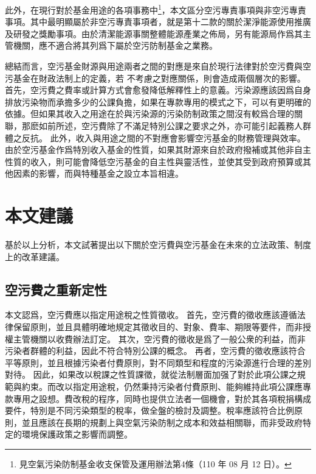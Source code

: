 \documentclass[12pt,a4paper]{article}
\begin{document}
此外，在現行對於基金用途的各項事務中\footnote{見空氣污染防制基金收支保管及運用辦法第4條（110 年 08 月 12 日）。}，本文區分空污專責事項與非空污專責事項。其中最明顯屬於非空污專責事項者，就是第十二款的關於潔淨能源使用推廣及研發之獎勵事項。由於清潔能源事關整體能源產業之佈局，另有能源局作爲其主管機關，應不適合將其列爲下屬於空污防制基金之業務。


總結而言，空污基金財源與用途兩者之間的對應是來自於現行法律對於空污費與空污基金在財政法制上的定義，若
不考慮之對應關係，則會造成兩個層次的影響。首先，空污費之費率或計算方式會愈發降低解釋性上的意義。污染源應該因爲自身排放污染物而承擔多少的公課負擔，如果在專款專用的模式之下，可以有更明確的依據。但如果其收入之用途在於與污染源的污染防制政策之間沒有較爲合理的關聯，那麽如前所述，空污費除了不滿足特別公課之要求之外，亦可能引起義務人群體之反抗。
此外，收入與用途之間的不對應會影響空污基金的財務管理與效率。由於空污基金作爲特別收入基金的性質，如果其財源來自於政府撥補或其他非自主性質的收入，則可能會降低空污基金的自主性與靈活性，並使其受到政府預算或其他因素的影響，而與特種基金之設立本旨相違。


\section{本文建議}

基於以上分析，本文試著提出以下關於空污費與空污基金在未來的立法政策、制度上的改革建議。

\subsection{空污費之重新定性}

本文認爲，空污費應以指定用途稅之性質徵收。
首先，空污費的徵收應該遵循法律保留原則，並且具體明確地規定其徵收目的、對象、費率、期限等要件，而非授權主管機關以收費辦法訂定。
其次，空污費的徵收是爲了一般公衆的利益，而非污染者群體的利益，因此不符合特別公課的概念。
再者，空污費的徵收應該符合平等原則，並且根據污染者付費原則，對不同類型和程度的污染源進行合理的差別對待。
因此，如果改以稅課之性質課徵，就從法制層面加强了對於此項公課之規範與約束。而改以指定用途稅，仍然秉持污染者付費原則、能夠維持此項公課應專款專用之設想。費改稅的程序，同時也提供立法者一個機會，對於其各項稅捐構成要件，特別是不同污染類型的稅率，做全盤的檢討及調整。稅率應該符合比例原則，並且應該在長期的規劃上與空氣污染防制之成本和效益相關聯，而非受政府特定的環境保護政策之影響而調整。
\end{document}
